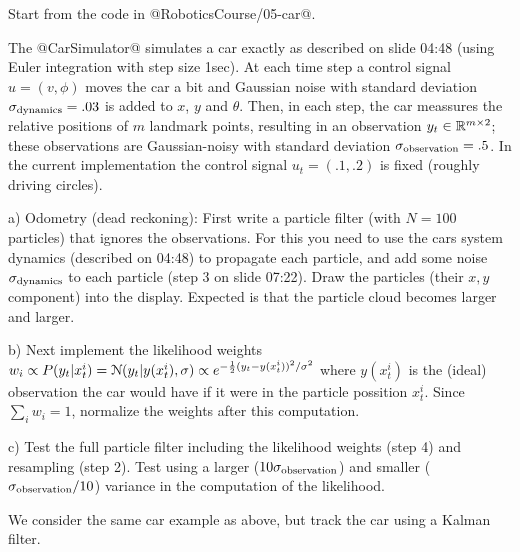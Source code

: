 

\renewcommand{\course}{Robotics}
\renewcommand{\coursepicture}{roboticsLecture}
\renewcommand{\coursedate}{Winter 2014}
\renewcommand{\exnum}{9}

\exercises



Start from the code in @RoboticsCourse/05-car@.

The @CarSimulator@ simulates a car exactly as described on slide 04:48
(using Euler integration with step size 1sec). At each time step a
control signal $u=(v,\phi)$ moves the car a bit and Gaussian noise
with standard deviation $\sigma_\text{dynamics}=.03$ is added to $x$, $y$
and $\theta$. Then, in each step, the car meassures the relative
positions of $m$ landmark points, resulting in an observation $y_t \in{\mathbb{R}}^
{m\times 2}$; these observations are Gaussian-noisy with standard
deviation $\sigma_\text{observation}=.5$. In the current implementation the
control signal $u_t=(.1,.2)$ is fixed (roughly driving circles).

a) Odometry (dead reckoning): First write a particle filter (with
$N=100$ particles) that ignores the observations. For this you need to
use the cars system dynamics (described on 04:48) to propagate each
particle, and add some noise $\sigma_\text{dynamics}$ to each particle
(step 3 on slide 07:22). Draw the particles (their $x,y$ component)
into the display. Expected is that the particle cloud becomes larger
and larger.

b) Next implement the likelihood weights $w_i \propto P(y_t | x^i_t) =
{\cal N}(y_t | y(x_t^i), \sigma) \propto e^{-\frac{1}{2} (y_t - y(x_t^i))^2/\sigma^2}$
where $y(x_t^i)$ is the (ideal) observation the car would have if it
were in the particle possition $x_t^i$. Since $\sum_i w_i = 1$,
normalize the weights after this computation.

c) Test the full particle filter including the likelihood weights
(step 4) and resampling (step 2). Test using a larger
($10\sigma_\text{observation}$) and smaller ($\sigma_\text{observation}/10$)
variance in the computation of the likelihood.





We consider the same car example as above, but track the car using a Kalman filter.

